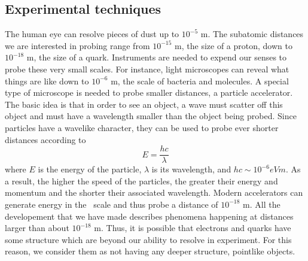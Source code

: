 \subsection*{Experimental techniques}

The human eye can resolve pieces of dust up to $10^{-5}$ m.
The subatomic distances we are interested in probing range
from  $10^{-15}$ m, the size of a proton, 
down to $10^{-18}$ m, the size of a quark.
Instruments are needed to expend our senses to 
probe these very small scales.
For instance, light microscopes can reveal what things are like down to 
$10^{-6}$ m, the scale of bacteria and molecules. 
A special type of microscope is needed to probe smaller distances, 
 a particle accelerator.
The basic idea is that in order to see an object, a wave must scatter off 
this object and must have a wavelength smaller than the object being 
probed.
Since particles have a wavelike character, they can be used to 
probe ever shorter distances according to
\[
E = \frac{hc}{\lambda}
\]
where $E$ is the energy of the particle, $\lambda$ is its wavelength, 
and $hc \sim 10^{-6} eV m$. As a result, 
the higher the speed of the particles, the greater their 
energy and momentum and the shorter their associated wavelength.
Modern accelerators can generate energy in the \TeV~scale and thus probe 
a distance of $10^{-18}$ m.
All the developement that we have made 
describes phenomena happening at distances larger than about $10^{-18}$ m.
Thus, it is possible that electrons and quarks have some structure which are 
beyond our ability to resolve in experiment. For this reason, we consider 
them as not having any deeper structure, pointlike objects. 

